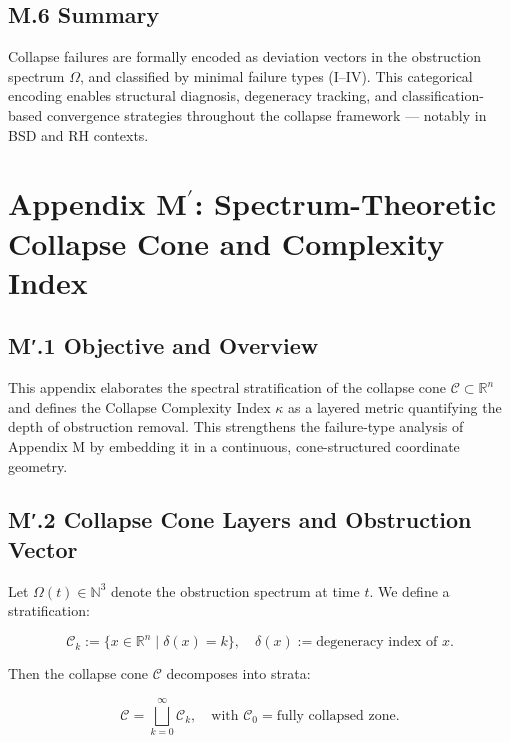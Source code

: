 \documentclass[11pt]{article}
\begin{document}
\subsection*{M.6 Summary}

Collapse failures are formally encoded as deviation vectors in the obstruction spectrum \( \Omega \), and classified by minimal failure types (I–IV). This categorical encoding enables structural diagnosis, degeneracy tracking, and classification-based convergence strategies throughout the collapse framework — notably in BSD and RH contexts.



\appendix
\section*{Appendix M$^\prime$: Spectrum-Theoretic Collapse Cone and Complexity Index}

\subsection*{M′.1 Objective and Overview}

This appendix elaborates the spectral stratification of the collapse cone \( \mathcal{C} \subset \mathbb{R}^n \) and defines the Collapse Complexity Index \( \kappa \) as a layered metric quantifying the depth of obstruction removal. This strengthens the failure-type analysis of Appendix M by embedding it in a continuous, cone-structured coordinate geometry.

\subsection*{M′.2 Collapse Cone Layers and Obstruction Vector}

Let \( \Omega(t) \in \mathbb{N}^3 \) denote the obstruction spectrum at time \( t \).  
We define a stratification:

\[
\mathcal{C}_k := \{ x \in \mathbb{R}^n \mid \delta(x) = k \},
\quad \delta(x) := \text{degeneracy index of } x.
\]

Then the collapse cone \( \mathcal{C} \) decomposes into strata:

\[
\mathcal{C} = \bigsqcup_{k = 0}^\infty \mathcal{C}_k,
\quad \text{with } \mathcal{C}_0 = \text{fully collapsed zone}.
\]
\end{document}
